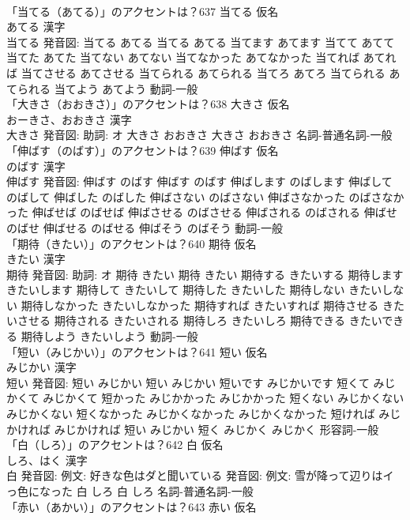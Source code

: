 \documentclass[8pt]{extreport}
\begin{document}
\begin{CJK}{UTF8}{min}
\\	「当てる（あてる）」のアクセントは？637	当てる 仮名　
\\	あてる 漢字　
\\	当てる 発音図:	当てる あてる		当てる あてる 当てます あてます 当てて あてて 当てた あてた 当てない あてない 当てなかった あてなかった 当てれば あてれば 当てさせる あてさせる 当てられる あてられる 当てろ あてろ 当てられる あてられる 当てよう あてよう				動詞-一般 
\\	「大きさ（おおきさ）」のアクセントは？638	大きさ 仮名　
\\	おーきさ、おおきさ 漢字　
\\	大きさ 発音図: 助詞: オ	大きさ おおきさ		大きさ おおきさ				名詞-普通名詞-一般 
\\	「伸ばす（のばす）」のアクセントは？639	伸ばす 仮名　
\\	のばす 漢字　
\\	伸ばす 発音図:	伸ばす のばす		伸ばす のばす 伸ばします のばします 伸ばして のばして 伸ばした のばした 伸ばさない のばさない 伸ばさなかった のばさなかった 伸ばせば のばせば 伸ばさせる のばさせる 伸ばされる のばされる 伸ばせ のばせ 伸ばせる のばせる 伸ばそう のばそう				動詞-一般 
\\	「期待（きたい）」のアクセントは？640	期待 仮名　
\\	きたい 漢字　
\\	期待 発音図: 助詞: オ	期待 きたい		期待 きたい 期待する きたいする 期待します きたいします 期待して きたいして 期待した きたいした 期待しない きたいしない 期待しなかった きたいしなかった 期待すれば きたいすれば 期待させる きたいさせる 期待される きたいされる 期待しろ きたいしろ 期待できる きたいできる 期待しよう きたいしよう				動詞-一般 
\\	「短い（みじかい）」のアクセントは？641	短い 仮名　
\\	みじかい 漢字　
\\	短い 発音図:	短い みじかい		短い みじかい 短いです みじかいです 短くて みじかくて みじかくて 短かった みじかかった みじかかった 短くない みじかくない みじかくない 短くなかった みじかくなかった みじかくなかった 短ければ みじかければ みじかければ 短い みじかい 短く みじかく みじかく				形容詞-一般 
\\	「白（しろ）」のアクセントは？642	白 仮名　
\\	しろ、はく 漢字　
\\	白 発音図: 例文: 好きな色はダと聞いている 発音図: 例文: 雪が降って辺りはイっ色になった	白 しろ		白 しろ				名詞-普通名詞-一般 
\\	「赤い（あかい）」のアクセントは？643	赤い 仮名　

\end{CJK}
\end{document}
